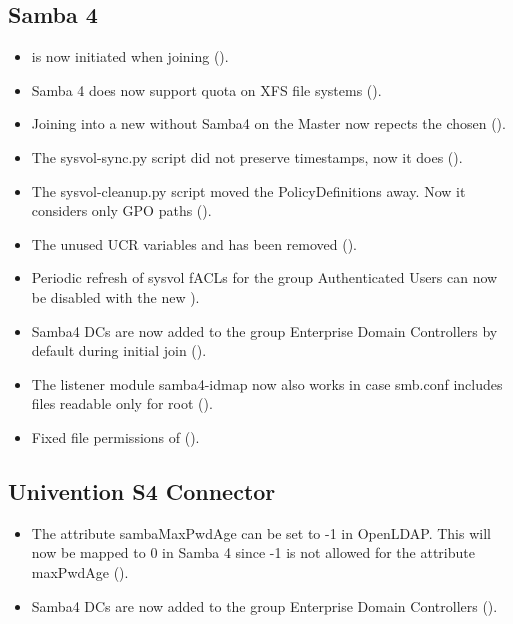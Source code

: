 \subsection{Samba 4}
\begin{itemize}
\item {} is now initiated when joining  ().
\item Samba 4 does now support quota on XFS file systems ().
\item Joining into a new  without Samba4 on the Master now repects the chosen  ().
\item The sysvol-sync.py script did not preserve timestamps, now it does ().
\item The sysvol-cleanup.py script moved the PolicyDefinitions away. Now it considers only GPO paths ().
\item The unused UCR variables  and  has been removed ().
\item Periodic refresh of sysvol fACLs for the group Authenticated Users can
now be disabled with the new  ).
\item Samba4 DCs are now added to the group Enterprise Domain Controllers
by default during initial join ().
\item The listener module samba4-idmap now also works in case smb.conf includes files readable
only for root ().
\item Fixed file permissions of  ().
\end{itemize}

\subsection{Univention S4 Connector}
\begin{itemize}
\item The attribute sambaMaxPwdAge can be set to -1 in OpenLDAP. This will
  now be mapped to 0 in Samba 4 since -1 is not allowed for the attribute
  maxPwdAge ().
\item Samba4 DCs are now added to the group Enterprise Domain Controllers ().
\end{itemize}



